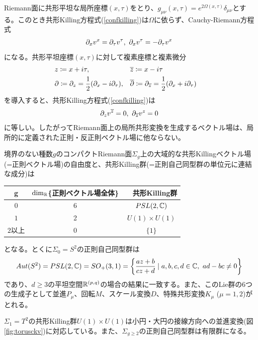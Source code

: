 \begin{ex}
Riemann面に共形平坦な局所座標$(x,\tau)$をとり、$g_{\mu\nu}(x,\tau)=e^{2\Omega(x,\tau)}\delta_{\mu\nu}$とする。このとき共形Killing方程式(\ref{confkilling})は$\Omega$に依らず、Cauchy-Riemann方程式
\begin{align}
\partial_x v^x=\partial_\tau v^\tau,\ \partial_x v^\tau= -\partial_\tau v^x
\end{align}
になる。共形平坦座標$(x,\tau)$に対して複素座標と複素微分
\begin{align}
&z\coloneqq x+i\tau, &&\overline{z}\coloneqq x-i\tau&&\\
&\partial\coloneqq \partial_z=\frac{1}{2}(\partial_x-i\partial_\tau), &&\overline{\partial}\coloneqq \partial_{\overline{z}}=\frac{1}{2}(\partial_x+i\partial_\tau)&&
\end{align}
を導入すると、共形Killing方程式(\ref{confkilling})は
\begin{align}
\partial_z v^{\overline{z}}=0,\  \partial_{\overline{z}} v^z=0
\end{align}
に等しい。したがってRiemann面上の局所共形変換を生成するベクトル場は、局所的に定義された正則・反正則ベクトル場に他ならない。

境界のない種数$g$のコンパクトRiemann面$\Sigma_g$上の大域的な共形Killingベクトル場(=正則ベクトル場)の自由度と、共形Killing群(=正則自己同型群の単位元に連結な成分)は
\begin{table}[H]
	\centering
	\begin{tabular}{|c|c|c|}\hline
		g & $\dim_{\mathbb{R}}$\{正則ベクトル場全体\} &　共形Killing群 \\ \hline
		$0$ & 6 & $PSL(2,\mathbb{C})$ \\\hline
		$1$ & 2 & $U(1)\times U(1)$\\\hline
		$2$以上 & 0 & $\{1\}$\\ \hline
	\end{tabular}
\end{table}
となる。とくに$\Sigma_0=S^2$の正則自己同型群は
\begin{align}
Aut(S^2)=PSL(2,\mathbb{C})=SO_+(3,1)=\left\{ \frac{az+b}{cz+d} \mid a,b,c,d\in \mathbb{C},\ ad-bc\neq 0 \right\}
\end{align}
であり、$d\geq 3$の平坦空間$\mathbb{R}^{(p,q)}$の場合の結果に一致する。また、このLie群の6つの生成子として並進$P_\mu$、回転$M$、スケール変換$D$、特殊共形変換$K_\mu$ ($\mu=1,2$)がとれる。

$\Sigma_1=T^2$の共形Killing群$U(1)\times U(1)$は小円・大円の接線方向への並進変換(図\ref{fig:torusckv})に対応している。また、$\Sigma_{g\geq 2}$の正則自己同型群は有限群になる。


\end{ex}

